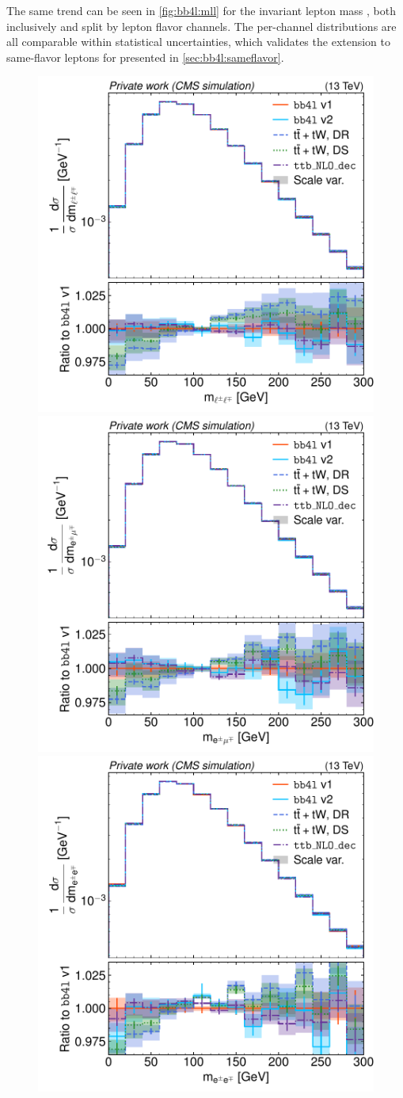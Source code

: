 The same trend can be seen in \cref{fig:bb4l:mll} for the invariant lepton mass \mll, both inclusively and split by lepton flavor channels. The per-channel distributions are all comparable within statistical uncertainties, which validates the extension to same-flavor leptons for \bbfourl presented in \cref{sec:bb4l:sameflavor}.

\begin{figure}[tp]
    \centering
    \includegraphics[width=0.49 \textwidth]{figures/bb4l/generators/MC_TTBAR_DILEP_SPINDENSITY_mll.pdf}
    \hfill
    \includegraphics[width=0.49 \textwidth]{figures/bb4l/generators/MC_TTBAR_DILEP_SPINDENSITY_mll_emu.pdf}
    \includegraphics[width=0.49 \textwidth]{figures/bb4l/generators/MC_TTBAR_DILEP_SPINDENSITY_mll_ee.pdf}

\end{figure}
